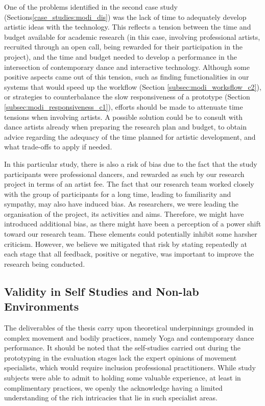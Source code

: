 One of the problems identified in the second case study (Sections\ref{case_studies:modi_dis}) was the lack of time to adequately develop artistic ideas with the technology.%
This reflects a tension between the time and budget available for academic research (in this case, involving professional artists, recruited through an open call, being rewarded for their participation in the project), and the time and budget needed to develop a performance in the intersection of contemporary dance and interactive technology. Although some positive aspects came out of this tension, such as finding functionalities in our systems that would speed up the workflow (Section \ref{subsec:modi_worksflow_c2}), or strategies to counterbalance the slow responsiveness of a prototype (Section \ref{subsec:modi_responsiveness_c1}), efforts should be made to attenuate time tensions when involving artists. A possible solution could be to consult with dance artists already when preparing the research plan and budget, to obtain advice regarding the adequacy of the time planned for artistic development, and what trade-offs to apply if needed.

In this particular study, there is also a risk of bias due to the fact that the study participants were professional dancers, and rewarded as such by our research project in terms of an artist fee. The fact that our research team worked closely with the group of participants for a long time, leading to familiarity and sympathy, may also have induced bias. As researchers, we were leading the organisation of the project, its activities and aims. Therefore, we might have introduced additional bias, as there might have been a perception of a power shift toward our research team. These elements could potentially inhibit some harsher criticism. However, we believe we mitigated that risk by stating repeatedly at each stage that all feedback, positive or negative, was important to improve the research being conducted.

\subsection{Validity in Self Studies and Non-lab Environments}

The deliverables of the thesis carry upon theoretical underpinnings grounded in complex movement and bodily practices, namely Yoga and contemporary dance performance. It should be noted that the self-studies carried out during the prototyping in the evaluation stages lack the expert opinions of movement specialists, which would require inclusion professional practitioners. While study subjects were able to admit to holding some valuable experience, at least in complimentary practices, we openly the acknowledge having a limited understanding of the rich intricacies that lie in such specialist areas.

